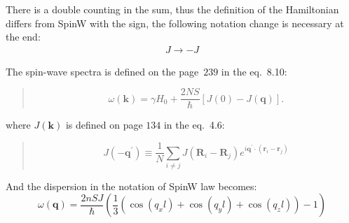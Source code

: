     There is a double counting in the sum, thus the definition of the Hamiltonian differs from SpinW with the sign, the following notation change is necessary at the end:
    \begin{equation}
        \begin{matrix} 
            J \rightarrow -J
        \end{matrix}
    \end{equation}

    The spin-wave spectra is defined on the page~$239$ in the eq.~8.10:
    \begin{quote}
        \begin{equation}
            \omega (\boldsymbol{k}) = \gamma H_0 + \dfrac{2NS}{\hbar}[J(0) - J(\boldsymbol{q})]. 
            \label{eq:qtom-8.10} \tag{8.10}
        \end{equation}
    \end{quote}
    where $J(\boldsymbol{k})$ is defined on page $134$ in the eq.~4.6:
    \begin{quote}
        \begin{equation}
            J(-\boldsymbol{q}^{\prime}) \equiv \dfrac{1}{N}\sum_{i \ne j}J(\boldsymbol{R}_i - \boldsymbol{R}_j)e^{i\boldsymbol{q}^{\prime}\cdot(\boldsymbol{r}_i - \boldsymbol{r}_j)}
            \label{eq:qtom-4.6} \tag{4.6}
        \end{equation}
    \end{quote}
    
    And the dispersion in the notation of SpinW law becomes:
    \begin{equation}
        \omega(\mathbf{q}) = \dfrac{2nSJ}{\hbar}\left(\dfrac{1}{3}\left(\cos(q_xl) + \cos(q_yl) + \cos(q_zl)\right) - 1\right)
    \end{equation}
